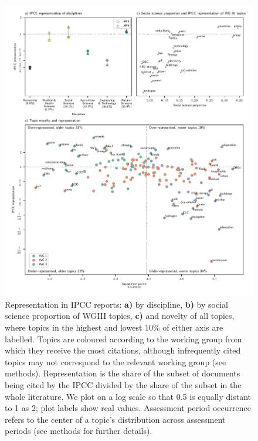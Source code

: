 \documentclass{article}
\begin{document}
\begin{linenumbers}
		
		\begin{figure}[htp]
			\begin{center}
				\includegraphics[width=180mm]{../plots_pub/big_panel_representation.pdf}
				\caption{Representation in IPCC reports: \textbf{a)} by discipline, \textbf{b)} by social science proportion of WGIII topics, \textbf{c)} and novelty of all topics, where topics in the highest and lowest 10\% of either axis are labelled. Topics are coloured according to the working group from which they receive the most citations, although infrequently cited topics may not correspond to the relevant working group (see methods). Representation is the share of the subset of documents being cited by the IPCC divided by the share of the subset in the whole literature. We plot on a log scale so that 0.5 is equally distant to 1 as 2; plot labels show real values. Assessment period occurrence refers to the center of a topic's distribution across assessment periods (see methods for further details).}
				\label{oecd_rep}
			\end{center}
		\end{figure}
		
		
		

\end{linenumbers}
\end{document}
